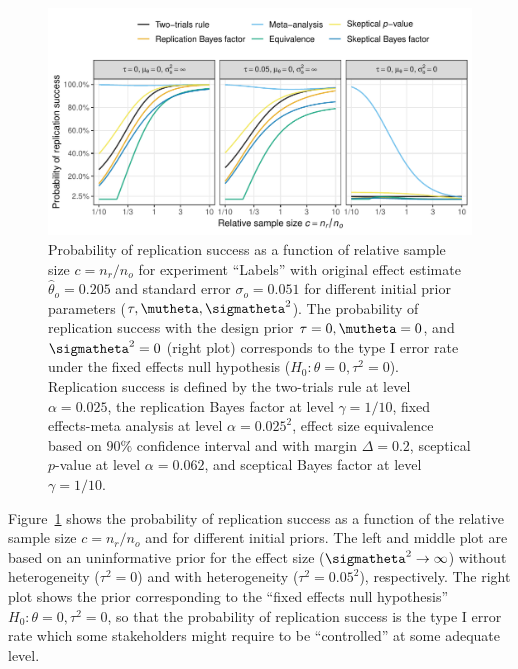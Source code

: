 \begin{figure}[!ht]
\begin{knitrout}
\color{fgcolor}
\includegraphics[width=\textwidth]{images/paper3/example-applied-1}
\end{knitrout}
\caption{Probability of replication success as a function of relative sample
  size $c = n_{r}/n_{o}$ for experiment ``Labels'' with original
  effect estimate $\hat{\theta}_{o} = 0.205$ and
  standard error $\sigma_{o} = 0.051$ for
  different initial prior parameters ($\tau, \mutheta, \sigmatheta^{2}$). The
  probability of replication success with the design prior
  $\tau = 0, \mutheta = 0$, and $\sigmatheta^{2} = 0$ (right plot) corresponds
  to the type I error rate under the fixed effects null hypothesis
  ($H_{0}\colon \theta = 0, \tau^{2} = 0$). Replication success is defined by
  the two-trials rule at level $\alpha = 0.025$, the replication
  Bayes factor at level $\gamma = 1/10$, fixed effects-meta
  analysis at level $\alpha = 0.025^{2}$, effect size
  equivalence based on $90\%$ confidence interval and with
  margin $\Delta = 0.2$, sceptical $p$-value at level
  $\alpha = 0.062$, and sceptical Bayes factor at level
  $\gamma = 1/10$.}
\label{fig3:example}
\end{figure}
Figure~\ref{fig3:example} shows the probability of replication success as a
function of the relative sample size $c = n_{r}/n_{o}$ and for different initial
priors. The left and middle plot are based on an uninformative prior for the
effect size ($\sigmatheta^{2} \to \infty$) without heterogeneity ($\tau^{2} = 0$)
and with heterogeneity ($\tau^{2} = 0.05^{2}$),
respectively. The right plot shows the prior corresponding to the ``fixed
effects null hypothesis'' $H_{0} \colon \theta = 0, \tau^{2} =
0$, %
so that the probability of replication success is the type I error rate which
some stakeholders might require to be ``controlled'' at some adequate level.

